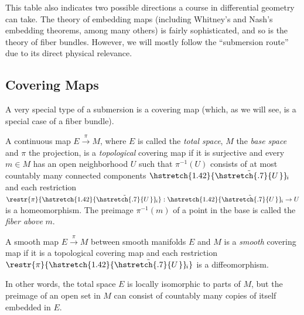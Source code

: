 \documentclass[english,letterpaper]{article}%
\numberwithin{equation}{section}
\numberwithin{figure}{section}
\numberwithin{table}{section}
\theoremstyle{definition}
\theoremstyle{definition}
\theoremstyle{definition}
\theoremstyle{plain}
\theoremstyle{plain}
\theoremstyle{plain}
\theoremstyle{plain}
\theoremstyle{remark}
\theoremstyle{remark}
\newcommand\wt[1]{\hstretch{1.42}{\tilde{\hstretch{.7}{#1\mkern2mu}}}\mkern-2mu}
\begin{document}
 This table also indicates two possible directions a course in differential geometry can take. The theory of embedding maps (including Whitney's and Nash's embedding theorems, among many others) is fairly sophisticated, and so is the theory of fiber bundles. However, we will mostly follow the ``submersion route'' due to its direct physical relevance.




\subsection{Covering Maps}

A very special type of a submersion is a covering map (which, as we will see, is a special case of a fiber bundle).
\begin{defn}
A continuous map $E\overset{\pi}{\to} M$, where $E$ is called the \emph{total space}, $M$ the \emph{base space} and $\pi$ the projection, is a \emph{topological} covering map if it is surjective and every $m\in M$ has an open neighborhood $U$ such that $\pi^{-1}(U)$ consists of at most countably many connected components $\wt{U}_i$ and each restriction $\restr{\pi}{\wt{U}_i}:\wt{U}_i\to U$ is a homeomorphism. The preimage $\pi^{-1}(m)$ of a point in the base is called the \emph{fiber above} $m$.
\end{defn}

\begin{defn}
A smooth map $E\overset{\pi}{\to} M$ between smooth manifolds $E$ and $M$ is a \emph{smooth} covering map if it is a topological covering map and each restriction $\restr{\pi}{\wt{U}_i}$ is a diffeomorphism.
\end{defn}

In other words, the total space $E$ is locally isomorphic to parts of $M$, but the preimage of an open set in $M$ can consist of countably many copies of itself embedded in $E$.
\end{document}
